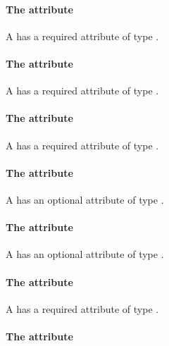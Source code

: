 \paragraph{The \fixttspace{} attribute}

A \SampledField has a required attribute  of type
.


\paragraph{The \fixttspace{} attribute}

A \SampledField has a required attribute  of type
.


\paragraph{The \fixttspace{} attribute}

A \SampledField has a required attribute  of type
.


\paragraph{The \fixttspace{} attribute}

A \SampledField has an optional attribute  of type
.


\paragraph{The \fixttspace{} attribute}

A \SampledField has an optional attribute  of
type .


\paragraph{The \fixttspace{} attribute}

A \SampledField has a required attribute  of
type .


\paragraph{The \fixttspace{} attribute}

